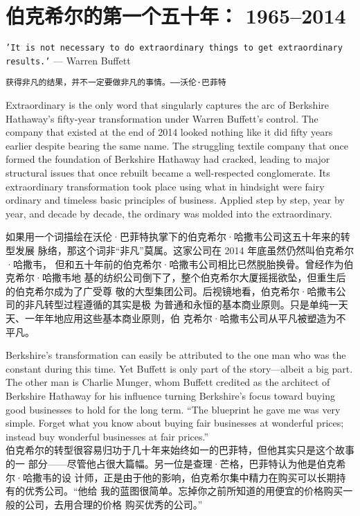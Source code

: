\chapter{伯克希尔的第一个五十年： 1965--2014}

\begin{center}
  \texttt{'It is not necessary to do extraordinary things to get extraordinary
    results.'} --- Warren Buffett

  \texttt{获得非凡的结果，并不一定要做非凡的事情。——沃伦·巴菲特}
\end{center}

\begin{verseparallel}
  {
    \noindent Extraordinary is the only word that singularly captures the arc of
    Berkshire Hathaway's fifty-year transformation under Warren Buffett's
    control. The company that existed at the end of 2014 looked nothing like it
    did fifty years earlier despite bearing the same name. The struggling
    textile company that once formed the foundation of Berkshire Hathaway had
    cracked, leading to major structural issues that once rebuilt became a
    well-respected conglomerate. Its extraordinary transformation took place
    using what in hindsight were fairy ordinary and timeless basic principles of
    business. Applied step by step, year by year, and decade by decade, the
    ordinary was molded into the extraordinary. \\
  }
  {

    如果用一个词描绘在沃伦·巴菲特执掌下的伯克希尔·哈撒韦公司这五十年来的转型发展
    脉络，那这个词非“非凡”莫属。这家公司在 2014 年底虽然仍然叫伯克希尔·哈撒韦，
    但和五十年前的伯克希尔·哈撒韦公司相比已然脱胎换骨。曾经作为伯克希尔·哈撒韦地
    基的纺织公司倒下了，整个伯克希尔大厦摇摇欲坠，但重生后的伯克希尔成为了广受尊
    敬的大型集团公司。后视镜地看，伯克希尔·哈撒韦公司的非凡转型过程遵循的其实是极
    为普通和永恒的基本商业原则。只是单纯一天天、一年年地应用这些基本商业原则，伯
    克希尔·哈撒韦公司从平凡被塑造为不平凡。

  }
\end{verseparallel}

\begin{verseparallel}
  {
    Berkshire's transformation can easily be attributed to the one man who was
    the constant during this time. Yet Buffett is only part of the story---albeit a
    big part. The other man is Charlie Munger, whom Buffett credited as the
    architect of Berkshire Hathaway for his influence turning Berkshire's focus
    toward buying good businesses to hold for the long term. ``The blueprint he
    gave me was very simple. Forget what you know about buying fair
    businesses at wonderful prices; instead buy wonderful businesses at fair
    prices.'' \\
  }
  {
    伯克希尔的转型很容易归功于几十年来始终如一的巴菲特，但他其实只是这个故事的一
    部分——尽管他占很大篇幅。另一位是查理·芒格，巴菲特认为他是伯克希尔·哈撒韦的设
    计师，正是由于他的影响，伯克希尔集中精力在购买可以长期持有的优秀公司。“他给
    我的蓝图很简单。忘掉你之前所知道的用便宜的价格购买一般的公司，去用合理的价格
    购买优秀的公司。”
  }
\end{verseparallel}

